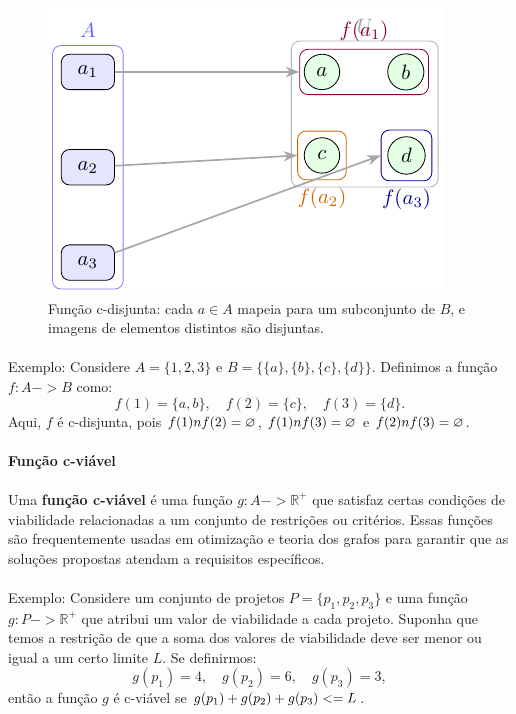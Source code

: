 \documentclass[12pt,a4paper]{article}
\def\emph#1{#1}%
\def\leq{\string<=}%
\def\cap{\string n}%
\def\to{->}%
\begin{document}
\begin{figure}[H]
    \centering
    \includegraphics[width=0.9\linewidth]{figures/fig_c_disjunta.pdf}

    \caption{Função c-disjunta: cada \(a\in A\) mapeia para um \emph{subconjunto} de $B$, e imagens de elementos distintos são disjuntas.}
    \label{fig:c-disjunta}
    \end{figure}


\paragraph{}
Exemplo: Considere \(A = \{1, 2, 3\}\) e \(B = \{\{a\}, \{b\}, \{c\}, \{d\}\}\). Definimos a função \(f: A \to B\) como:
\[f(1) = \{a, b\}, \quad f(2) = \{c\}, \quad f(3) = \{d\}.\]
Aqui, \(f\) é c-disjunta, pois \(f(1) \cap f(2) = \varnothing\), \(f(1) \cap f(3) = \varnothing\) e \(f(2) \cap f(3) = \varnothing\).

\paragraph{Função c-viável}

\paragraph{}Uma \textbf{função c-viável} é uma função \(g: A \to \mathbb{R}^+\) que satisfaz certas condições de viabilidade relacionadas a um conjunto de restrições ou critérios. Essas funções são frequentemente usadas em otimização e teoria dos grafos para garantir que as soluções propostas atendam a requisitos específicos.
\paragraph{}
Exemplo: Considere um conjunto de projetos \(P = \{p_1, p_2, p_3\}\) e uma função \(g: P \to \mathbb{R}^+\) que atribui um valor de viabilidade a cada projeto. Suponha que temos a restrição de que a soma dos valores de viabilidade deve ser menor ou igual a um certo limite \(L\). Se definirmos:
\[g(p_1) = 4, \quad g(p_2) = 6, \quad g(p_3) = 3,\]
então a função \(g\) é c-viável se \(g(p_1) + g(p_2) + g(p_3) \leq L\).
\end{document}
